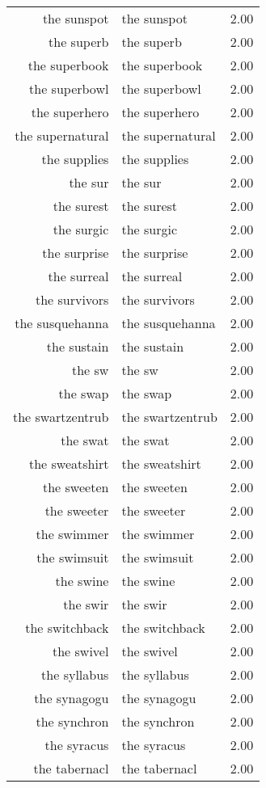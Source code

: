 \begin{table}[ht]
\begin{tabular}{rlr}
  the sunspot & the sunspot & 2.00 \\ 
  the superb & the superb & 2.00 \\ 
  the superbook & the superbook & 2.00 \\ 
  the superbowl & the superbowl & 2.00 \\ 
  the superhero & the superhero & 2.00 \\ 
  the supernatural & the supernatural & 2.00 \\ 
  the supplies & the supplies & 2.00 \\ 
  the sur & the sur & 2.00 \\ 
  the surest & the surest & 2.00 \\ 
  the surgic & the surgic & 2.00 \\ 
  the surprise & the surprise & 2.00 \\ 
  the surreal & the surreal & 2.00 \\ 
  the survivors & the survivors & 2.00 \\ 
  the susquehanna & the susquehanna & 2.00 \\ 
  the sustain & the sustain & 2.00 \\ 
  the sw & the sw & 2.00 \\ 
  the swap & the swap & 2.00 \\ 
  the swartzentrub & the swartzentrub & 2.00 \\ 
  the swat & the swat & 2.00 \\ 
  the sweatshirt & the sweatshirt & 2.00 \\ 
  the sweeten & the sweeten & 2.00 \\ 
  the sweeter & the sweeter & 2.00 \\ 
  the swimmer & the swimmer & 2.00 \\ 
  the swimsuit & the swimsuit & 2.00 \\ 
  the swine & the swine & 2.00 \\ 
  the swir & the swir & 2.00 \\ 
  the switchback & the switchback & 2.00 \\ 
  the swivel & the swivel & 2.00 \\ 
  the syllabus & the syllabus & 2.00 \\ 
  the synagogu & the synagogu & 2.00 \\ 
  the synchron & the synchron & 2.00 \\ 
  the syracus & the syracus & 2.00 \\ 
  the tabernacl & the tabernacl & 2.00 \\ 

\end{tabular}
\end{table}
